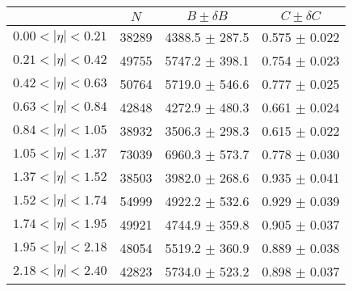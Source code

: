 \begin{tabular}{lccc}
\hline
    &   $N$   & $B \pm \delta B$  &  $C \pm \delta C$ \\
\hline
$0.00 < |\eta| <0.21$          & 38289      & 4388.5     $\pm$ 287.5 & 0.575      $\pm$ 0.022 \\
$0.21 < |\eta| <0.42$          & 49755      & 5747.2     $\pm$ 398.1 & 0.754      $\pm$ 0.023 \\
$0.42 < |\eta| <0.63$          & 50764      & 5719.0     $\pm$ 546.6 & 0.777      $\pm$ 0.025 \\
$0.63 < |\eta| <0.84$          & 42848      & 4272.9     $\pm$ 480.3 & 0.661      $\pm$ 0.024 \\
$0.84 < |\eta| <1.05$          & 38932      & 3506.3     $\pm$ 298.3 & 0.615      $\pm$ 0.022 \\
$1.05 < |\eta| <1.37$          & 73039      & 6960.3     $\pm$ 573.7 & 0.778      $\pm$ 0.030 \\
$1.37 < |\eta| <1.52$          & 38503      & 3982.0     $\pm$ 268.6 & 0.935      $\pm$ 0.041 \\
$1.52 < |\eta| <1.74$          & 54999      & 4922.2     $\pm$ 532.6 & 0.929      $\pm$ 0.039 \\
$1.74 < |\eta| <1.95$          & 49921      & 4744.9     $\pm$ 359.8 & 0.905      $\pm$ 0.037 \\
$1.95 < |\eta| <2.18$          & 48054      & 5519.2     $\pm$ 360.9 & 0.889      $\pm$ 0.038 \\
$2.18 < |\eta| <2.40$          & 42823      & 5734.0     $\pm$ 523.2 & 0.898      $\pm$ 0.037 \\
\hline
\end{tabular}
